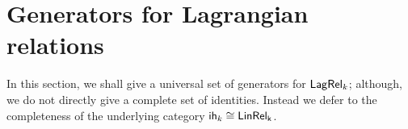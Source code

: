 \section{Generators for Lagrangian relations}
\label{sec:univ}

%

In this section, we shall give a universal set of generators for $\mathsf{Lag}\mathsf{Rel}_k$; although, we do not directly give a complete set of identities.  Instead we defer to the completeness of the underlying category ${\sf ih}_k\cong\sf LinRel_k$.


